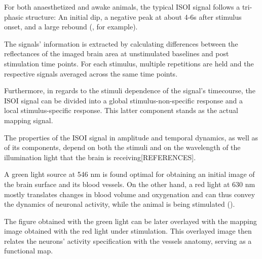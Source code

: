 For both anaesthetized and awake animals, the typical ISOI signal follows a tri-phasic structure: An initial dip, a negative peak at about 4-6s after stimulus onset, and a large rebound (\cite{Lu2017}, for example).

The signals' information is extracted by calculating differences between the reflectances of the imaged brain area at unstimulated baselines and post stimulation time points. For each stimulus, multiple repetitions are held and the respective signals averaged across the same time points.

Furthermore, in regards to the stimuli dependence of the signal's timecourse, the ISOI signal can be divided into a global stimulus-non-specific response and a local stimulus-specific response. This latter component stands as the actual mapping signal. 

The properties of the ISOI signal in amplitude and temporal dynamics, as well as of its components, depend on both the stimuli and on the wavelength of the illumination light that the brain is receiving[REFERENCES].

A green light source at 546 nm is found optimal for obtaining an initial image of the brain surface and its blood vessels. On the other hand, a red light at 630 nm mostly translates changes in blood volume and oxygenation and can thus convey the dynamics of neuronal activity, while the animal is being stimulated (\cite{Zepeda2004}). 

The figure obtained with the green light can be later overlayed with the mapping image obtained with the red light under stimulation. This overlayed image then relates the neurons' activity specification with the vessels anatomy, serving as a functional map.

